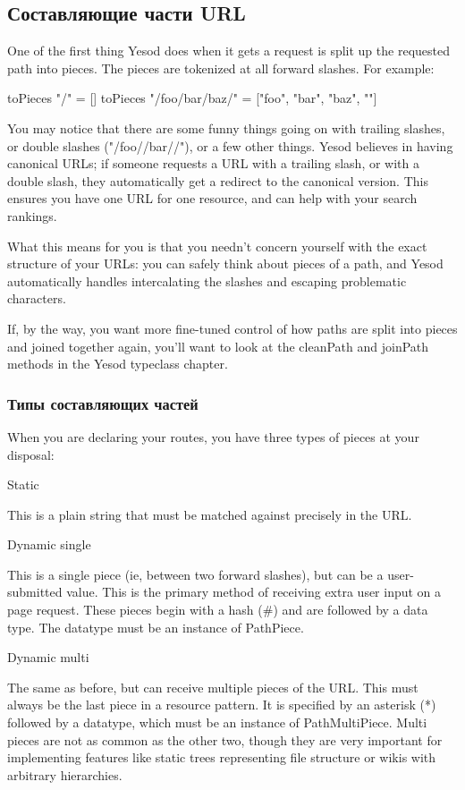 \subsection{Составляющие части URL}

One of the first thing Yesod does when it gets a request is split up
the requested path into pieces. The pieces are tokenized at all
forward slashes. For example:

toPieces "/" = []
toPieces "/foo/bar/baz/" = ["foo", "bar", "baz", ""]

You may notice that there are some funny things going on with trailing
slashes, or double slashes ("/foo//bar//"), or a few other
things. Yesod believes in having canonical URLs; if someone requests a
URL with a trailing slash, or with a double slash, they automatically
get a redirect to the canonical version. This ensures you have one URL
for one resource, and can help with your search rankings.

What this means for you is that you needn't concern yourself with the
exact structure of your URLs: you can safely think about pieces of a
path, and Yesod automatically handles intercalating the slashes and
escaping problematic characters.

If, by the way, you want more fine-tuned control of how paths are
split into pieces and joined together again, you'll want to look at
the cleanPath and joinPath methods in the Yesod typeclass chapter.

\subsubsection{Типы составляющих частей}

When you are declaring your routes, you have three types of pieces at
your disposal:

Static

This is a plain string that must be matched against precisely in the
URL.

Dynamic single

This is a single piece (ie, between two forward slashes), but can be a
user-submitted value. This is the primary method of receiving extra
user input on a page request. These pieces begin with a hash (#) and
are followed by a data type. The datatype must be an instance of
PathPiece.

Dynamic multi

The same as before, but can receive multiple pieces of the URL. This
must always be the last piece in a resource pattern. It is specified
by an asterisk (*) followed by a datatype, which must be an instance
of PathMultiPiece. Multi pieces are not as common as the other two,
though they are very important for implementing features like static
trees representing file structure or wikis with arbitrary
hierarchies.

